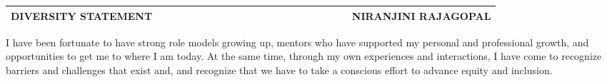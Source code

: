 \documentclass[10pt]{article}
\date{}
\begin{document}


\begin{table}
\color{blue}
\begin{tabular*}{\textwidth}{l r}
\large\textbf{DIVERSITY STATEMENT} & 
\hfill \ \ \ \ \ \ \ \ \ \ \ \ \ \ \ \ \ \ \ \
\ \ \ \ \ \ \ \ \ \ \ \ \ 
\large\textbf{NIRANJINI RAJAGOPAL}\\
\hline
\end{tabular*}

\end{table}




I have been fortunate to have strong role models growing up, mentors who have supported my personal and professional growth, and opportunities to get me to where I am today. At the same time, through my own experiences and interactions, I have come to recognize barriers and challenges that exist and, and recognize that we have to take a conscious effort to advance equity and inclusion. \\%



\end{document}
